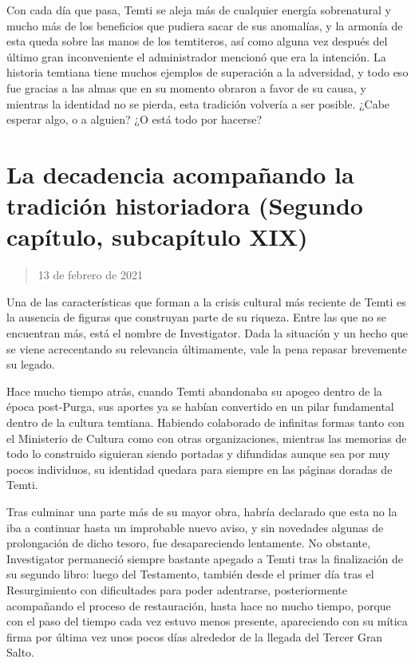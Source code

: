 \documentclass[
  spanish,
]{book}
\begin{document}
Con cada día que pasa, Temti se aleja más de cualquier energía sobrenatural y mucho más de los beneficios que pudiera sacar de sus anomalías, y la armonía de esta queda sobre las manos de los temtiteros, así como alguna vez después del último gran inconveniente el administrador mencionó que era la intención. La historia temtiana tiene muchos ejemplos de superación a la adversidad, y todo eso fue gracias a las almas que en su momento obraron a favor de su causa, y mientras la identidad no se pierda, esta tradición volvería a ser posible. ¿Cabe esperar algo, o a alguien? ¿O está todo por hacerse?

\hypertarget{la-decadencia-acompauxf1ando-la-tradiciuxf3n-historiadora-segundo-capuxedtulo-subcapuxedtulo-xix}{%
\section{La decadencia acompañando la tradición historiadora (Segundo capítulo, subcapítulo XIX)}\label{la-decadencia-acompauxf1ando-la-tradiciuxf3n-historiadora-segundo-capuxedtulo-subcapuxedtulo-xix}}

\begin{quote}
13 de febrero de 2021
\end{quote}

Una de las características que forman a la crisis cultural más reciente de Temti es la ausencia de figuras que construyan parte de su riqueza. Entre las que no se encuentran más, está el nombre de Investigator. Dada la situación y un hecho que se viene acrecentando su relevancia últimamente, vale la pena repasar brevemente su legado.

Hace mucho tiempo atrás, cuando Temti abandonaba su apogeo dentro de la época post-Purga, sus aportes ya se habían convertido en un pilar fundamental dentro de la cultura temtiana. Habiendo colaborado de infinitas formas tanto con el Ministerio de Cultura como con otras organizaciones, mientras las memorias de todo lo construido siguieran siendo portadas y difundidas aunque sea por muy pocos individuos, su identidad quedara para siempre en las páginas doradas de Temti.

Tras culminar una parte más de su mayor obra, habría declarado que esta no la iba a continuar hasta un improbable nuevo aviso, y sin novedades algunas de prolongación de dicho tesoro, fue desapareciendo lentamente. No obstante, Investigator permaneció siempre bastante apegado a Temti tras la finalización de su segundo libro: luego del Testamento, también desde el primer día tras el Resurgimiento con dificultades para poder adentrarse, posteriormente acompañando el proceso de restauración, hasta hace no mucho tiempo, porque con el paso del tiempo cada vez estuvo menos presente, apareciendo con su mítica firma por última vez unos pocos días alrededor de la llegada del Tercer Gran Salto.
\end{document}
